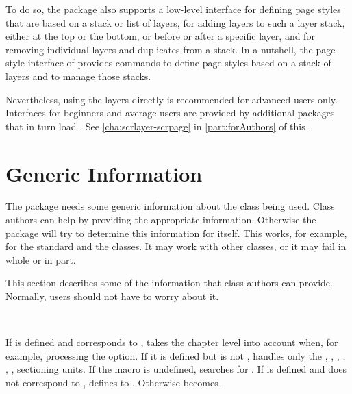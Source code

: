 To do so, the package also supports a low-level interface for defining page
styles that are based on a stack or list of layers, for adding layers to such
a layer stack, either at the top or the bottom, or before or after a specific
layer, and for removing individual layers and duplicates from a stack. In a
nutshell, the page style interface of  provides commands to
define page styles based on a stack of layers and to manage those stacks.

Nevertheless, using the layers directly is recommended for advanced users
only. Interfaces for beginners and average users are provided by additional
packages that in turn load . See
\autoref{cha:scrlayer-scrpage} in \autoref{part:forAuthors} of this
.



\section{Generic Information}

The package needs some generic information about the class being used. Class
authors can help  by providing the appropriate information.
Otherwise the package will try to determine this information for itself. This
works, for example, for the standard and the \KOMAScript{} classes. It may
work with other classes, or it may fail in whole or in part.

This section describes some of the information that class authors can provide.
Normally, users should not have to worry about it.

\begin{Declaration}
  \ \ \ %
  \ %
\end{Declaration}
If  is defined and corresponds to
,  takes the chapter level
into account when, for example, processing the
 option. If it is defined but is not
,  handles only the
, ,
, ,
, ,
 sectioning units. If the macro is undefined,
 searches for . If
 is defined and does not correspond to
,  defines  to
. Otherwise  becomes
.%
\EndIndexGroup


